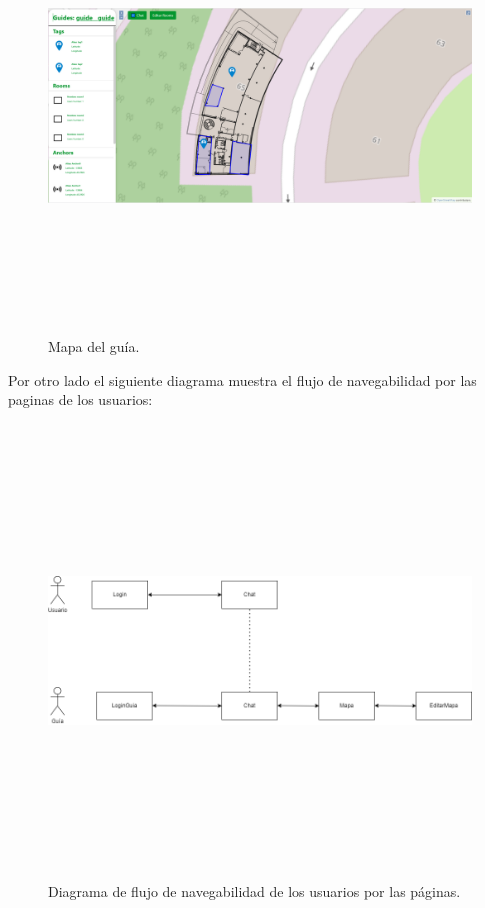 \FloatBarrier
\FloatBarrier
\begin{figure}[h]
    \centering
    \includegraphics[width=12cm,height=12cm,keepaspectratio]{img/Map.png}
    \caption{Mapa del guía.}
    \label{fig:Mapa del guía}
\end{figure}
\FloatBarrier

Por otro lado el siguiente diagrama muestra el flujo de navegabilidad por las paginas de los usuarios:

\FloatBarrier
\begin{figure}[h]
    \centering
    \includegraphics[width=12cm,height=12cm,keepaspectratio]{img/Flujo de navegabilidad.png}
    \caption{Diagrama de flujo de navegabilidad de los usuarios por las páginas.}
    \label{fig:Flujo de navegabilidad de los usuarios por las páginas}
\end{figure}
\FloatBarrier